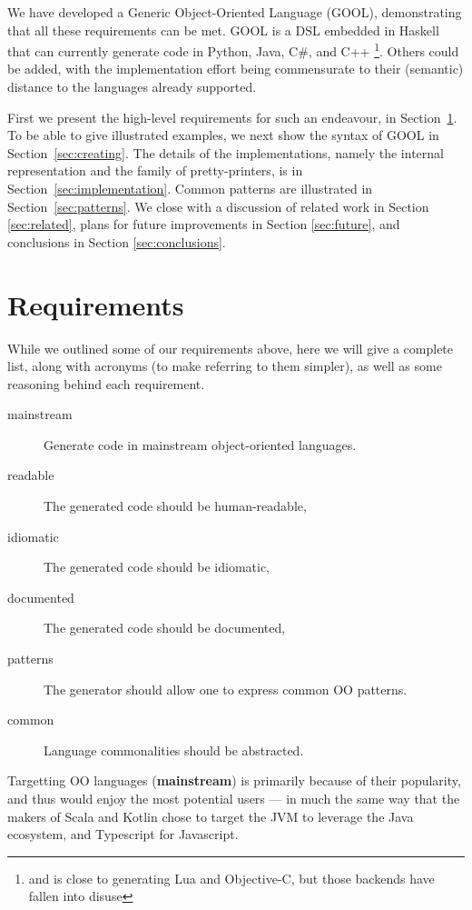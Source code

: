 \documentclass[sigplan,review,anonymous,prologue,dvipsnames]{acmart}
\newcommand{\abbrev}[1]{\textbf{#1}}
\newcommand{\mainstream}{\abbrev{mainstream}}
\begin{document}
We have developed a Generic Object-Oriented Language (GOOL), demonstrating
that all these requirements can be met.  GOOL is a DSL embedded in Haskell that
can currently generate code in Python, Java, C\#, and C++%
\footnote{and is close to generating Lua and Objective-C, but those backends
have fallen into disuse}. Others could be added, with the implementation
effort being commensurate to their (semantic) distance to the languages
already supported.

First we present the high-level requirements for such an endeavour, in
Section~\ref{sec:req}.  To be able to give illustrated examples, we
next show the syntax of GOOL in Section~\ref{sec:creating}. The details of
the implementations, namely the internal representation and the
family of pretty-printers, is in Section~\ref{sec:implementation}.
Common patterns are illustrated in Section~\ref{sec:patterns}.  We 
close with a discussion of related work in Section \ref{sec:related}, plans for 
future improvements in Section \ref{sec:future}, and conclusions in Section 
\ref{sec:conclusions}.

\section{Requirements} \label{sec:req}

While we outlined some of our requirements above, here we will give a 
complete list, along with acronyms (to make referring to them simpler),
as well as some reasoning behind each requirement.

\begin{description}
\item[mainstream] Generate code in mainstream object-oriented languages.
\item[readable] The generated code should be human-readable,
\item[idiomatic] The generated code should be idiomatic,
\item[documented] The generated code should be documented,
\item[patterns] The generator should allow one to express common OO patterns.
\item[common] Language commonalities should be abstracted.
\end{description}

Targetting OO languages (\mainstream) is primarily because of their popularity, and thus
would enjoy the most potential users --- in much the same way that the makers
of Scala and Kotlin chose to target the JVM to leverage the Java ecosystem, and
Typescript for Javascript.
\end{document}
